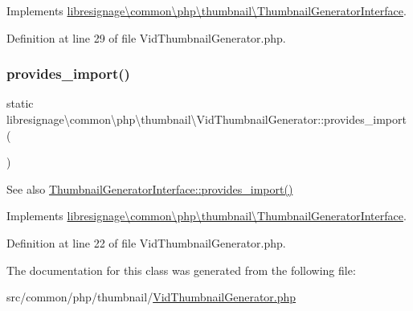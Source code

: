 Implements \hyperlink{interfacelibresignage_1_1common_1_1php_1_1thumbnail_1_1ThumbnailGeneratorInterface_a8740f912c85094c22b397f7df0142cde}{libresignage\textbackslash{}common\textbackslash{}php\textbackslash{}thumbnail\textbackslash{}\+Thumbnail\+Generator\+Interface}.



Definition at line 29 of file Vid\+Thumbnail\+Generator.\+php.

\mbox{\label{classlibresignage_1_1common_1_1php_1_1thumbnail_1_1VidThumbnailGenerator_ac425e90b4944a08c887d99d5cc72f3ff}} 
\subsubsection{\texorpdfstring{provides\+\_\+import()}{provides\_import()}}
{\footnotesize\ttfamily static libresignage\textbackslash{}common\textbackslash{}php\textbackslash{}thumbnail\textbackslash{}\+Vid\+Thumbnail\+Generator\+::provides\+\_\+import (\begin{DoxyParamCaption}{ }\end{DoxyParamCaption})\hspace{0.3cm}{\ttfamily [static]}}

\begin{DoxySeeAlso}{See also}
\hyperlink{interfacelibresignage_1_1common_1_1php_1_1thumbnail_1_1ThumbnailGeneratorInterface_a2fe5cbf9b09b7ef8416cfa86999aaab8}{Thumbnail\+Generator\+Interface\+::provides\+\_\+import()} 
\end{DoxySeeAlso}


Implements \hyperlink{interfacelibresignage_1_1common_1_1php_1_1thumbnail_1_1ThumbnailGeneratorInterface_a2fe5cbf9b09b7ef8416cfa86999aaab8}{libresignage\textbackslash{}common\textbackslash{}php\textbackslash{}thumbnail\textbackslash{}\+Thumbnail\+Generator\+Interface}.



Definition at line 22 of file Vid\+Thumbnail\+Generator.\+php.



The documentation for this class was generated from the following file\+:\begin{DoxyCompactItemize}
\item 
src/common/php/thumbnail/\hyperlink{VidThumbnailGenerator_8php}{Vid\+Thumbnail\+Generator.\+php}\end{DoxyCompactItemize}

